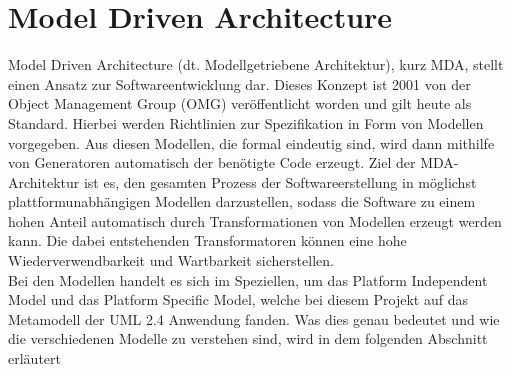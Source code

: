 \section{Model Driven Architecture} \label{MDA}
Model Driven Architecture (dt. Modellgetriebene Architektur), kurz MDA, stellt
einen Ansatz zur Softwareentwicklung dar. Dieses Konzept ist 2001 von der
Object Management Group (OMG) veröffentlicht worden und gilt heute als
Standard. Hierbei werden Richtlinien zur Spezifikation in Form von Modellen vorgegeben.
Aus diesen Modellen, die formal eindeutig sind, wird dann mithilfe von Generatoren
automatisch der benötigte Code erzeugt. Ziel der MDA-Architektur ist es, den gesamten Prozess der Softwareerstellung in möglichst plattformunabhängigen Modellen darzustellen, sodass die Software zu einem hohen Anteil automatisch durch Transformationen von Modellen erzeugt werden kann. Die dabei entstehenden Transformatoren können eine hohe Wiederverwendbarkeit und Wartbarkeit sicherstellen.\cite[S. 79 f.]{bib:MDA1}\\
Bei den Modellen handelt es sich im Speziellen, um das Platform Independent Model und das Platform Specific Model, welche bei diesem Projekt auf das Metamodell der UML 2.4 Anwendung fanden.
Was dies genau bedeutet und wie die verschiedenen Modelle zu verstehen sind, wird in dem folgenden Abschnitt erläutert
